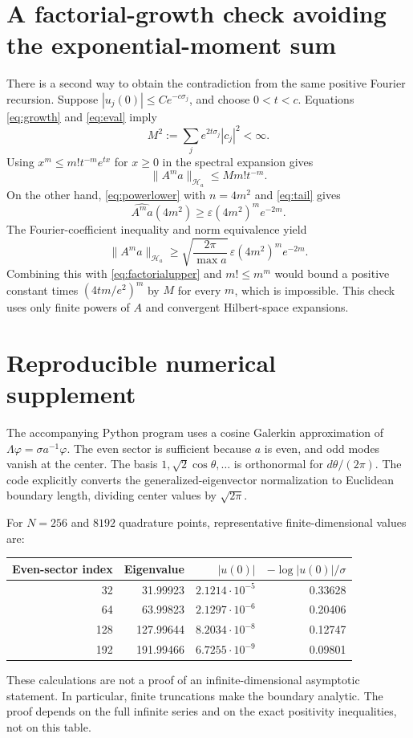 \documentclass[11pt]{article}
\theoremstyle{remark}
\newcommand{\Hh}{\mathcal H}
\newcommand{\eps}{\varepsilon}
\begin{document}
\appendix
\section{A factorial-growth check avoiding the exponential-moment sum}
There is a second way to obtain the contradiction from the same positive Fourier recursion. Suppose $|u_j(0)|\leq C e^{-c\sigma_j}$, and choose $0<t<c$. Equations \eqref{eq:growth} and \eqref{eq:eval} imply
\[
 M^2:=\sum_j e^{2t\sigma_j}|c_j|^2<\infty.
\]
Using $x^m\leq m!t^{-m}e^{tx}$ for $x\geq0$ in the spectral expansion gives
\begin{equation}\label{eq:factorialupper}
 \|A^m a\|_{\Hh_a}\leq M m!t^{-m}.
\end{equation}
On the other hand, \eqref{eq:powerlower} with $n=4m^2$ and \eqref{eq:tail} gives
\[
 \widehat{A^m a}(4m^2)\geq\eps(4m^2)^m e^{-2m}.
\]
The Fourier-coefficient inequality and norm equivalence yield
\[
 \|A^m a\|_{\Hh_a}
 \geq\sqrt{\frac{2\pi}{\max a}}\,
      \eps(4m^2)^m e^{-2m}.
\]
Combining this with \eqref{eq:factorialupper} and $m!\leq m^m$ would bound a positive constant times $(4tm/e^2)^m$ by $M$ for every $m$, which is impossible. This check uses only finite powers of $A$ and convergent Hilbert-space expansions.

\section{Reproducible numerical supplement}
The accompanying Python program uses a cosine Galerkin approximation of
$\Lambda\varphi=\sigma a^{-1}\varphi$. The even sector is sufficient because $a$ is even, and odd modes vanish at the center. The basis $1,\sqrt2\cos\theta,\ldots$ is orthonormal for $d\theta/(2\pi)$. The code explicitly converts the generalized-eigenvector normalization to Euclidean boundary length, dividing center values by $\sqrt{2\pi}$.

For $N=256$ and $8192$ quadrature points, representative finite-dimensional values are:
\begin{center}
\begin{tabular}{rrrr}
\toprule
Even-sector index & Eigenvalue & $|u(0)|$ & $-\log|u(0)|/\sigma$\\
\midrule
32  & 31.99923  & $2.1214\cdot10^{-5}$ & 0.33628\\
64  & 63.99823  & $2.1297\cdot10^{-6}$ & 0.20406\\
128 & 127.99644 & $8.2034\cdot10^{-8}$ & 0.12747\\
192 & 191.99466 & $6.7255\cdot10^{-9}$ & 0.09801\\
\bottomrule
\end{tabular}
\end{center}
These calculations are not a proof of an infinite-dimensional asymptotic statement. In particular, finite truncations make the boundary analytic. The proof depends on the full infinite series and on the exact positivity inequalities, not on this table.
\end{document}
